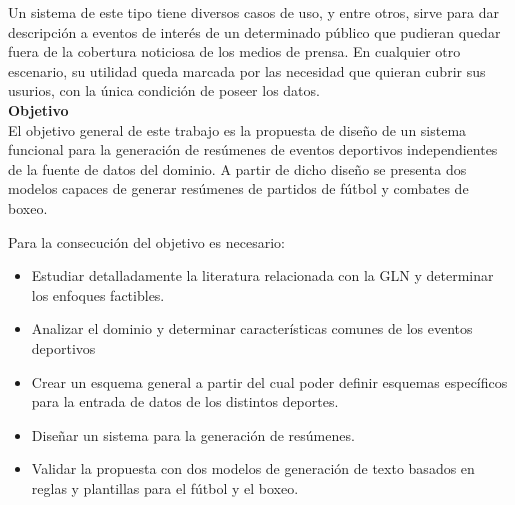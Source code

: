     Un sistema de este tipo tiene diversos casos de uso, y entre otros, sirve para dar descripción a eventos de interés de un 
determinado público que pudieran quedar fuera de la cobertura noticiosa de los medios de prensa. En cualquier otro escenario, 
su utilidad queda marcada por las necesidad que quieran cubrir sus usurios, con la única condición de poseer los datos.
\\

    \textbf{Objetivo}\\

    El objetivo general de este trabajo es la propuesta de diseño de un sistema funcional para la generación de res\'umenes de eventos deportivos 
independientes de la fuente de datos del dominio. A partir de dicho diseño se presenta dos modelos capaces de generar resúmenes de partidos de 
fútbol y combates de boxeo. 

    Para la consecución del objetivo es necesario:

    \begin{itemize}
        \item Estudiar detalladamente la literatura relacionada con la GLN y determinar los enfoques factibles.
        \item Analizar el dominio y determinar características comunes de los eventos deportivos
        \item Crear un esquema general a partir del cual poder definir esquemas específicos para la entrada de datos de los distintos deportes.
        \item Diseñar un sistema para la generación de resúmenes.
        \item Validar la propuesta con dos modelos de generación de texto basados en reglas y plantillas para el fútbol y el boxeo.   
    \end{itemize}



